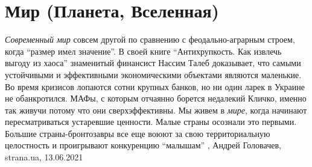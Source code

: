  
 
 
 
 
\chapter{Мир (Планета, Вселенная)}

\emph{Современный мир} совсем другой по сравнению с феодально-аграрным строем, когда
\enquote{размер имел значение}. В своей книге \enquote{Антихрупкость. Как
извлечь выгоду из хаоса} знаменитый финансист Нассим Талеб доказывает, что
самыми устойчивыми и эффективными экономическими объектами являются маленькие.
Во время кризисов лопаются сотни крупных банков, но ни один ларек в Украине не
обанкротился.  МАФы, с которым отчаянно борется недалекий Кличко, именно так
живучи потому что они сверхэффективны.  Мы живем в \emph{мире}, когда начинают
пересматриваться устаревшие ценности. Малые страны осознали это первыми.
Большие страны-бронтозавры все еще воюют за свою территориальную целостность и
проигрывают конкуренцию \enquote{малышам}
, 
Андрей Головачев, strana.ua, 13.06.2021

